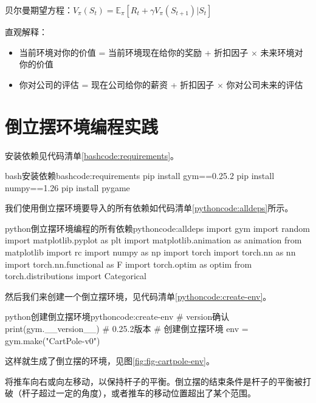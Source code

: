 \documentclass[lang=cn,newtx,10pt,scheme=chinese]{elegantbook}
\begin{document}
\begin{marker}
贝尔曼期望方程：$V_\pi(S_t) = \mathbb{E}_\pi[R_t+\gamma V_\pi(S_{t+1})|S_t]$
\end{marker}

\begin{marker}
直观解释：
\begin{itemize}
\item 当前环境对你的价值 = 当前环境现在给你的奖励 + 折扣因子 $\times$ 未来环境对你的价值
\item 你对公司的评估 = 现在公司给你的薪资 + 折扣因子 $\times$ 你对公司未来的评估
\end{itemize}
\end{marker}

\section{倒立摆环境编程实践}

安装依赖见代码清单\ref{bashcode:requirements}。

\begin{codebox}{bash}{安装依赖}{bashcode:requirements}
pip install gym==0.25.2
pip install numpy==1.26
pip install pygame
\end{codebox}

我们使用倒立摆环境要导入的所有依赖如代码清单\ref{pythoncode:alldeps}所示。

\begin{codebox}{python}{倒立摆环境编程的所有依赖}{pythoncode:alldeps}
import gym
import random
import matplotlib.pyplot as plt
import matplotlib.animation as animation
from matplotlib import rc
import numpy as np
import torch
import torch.nn as nn
import torch.nn.functional as F
import torch.optim as optim
from torch.distributions import Categorical
\end{codebox}

然后我们来创建一个倒立摆环境，见代码清单\ref{pythoncode:create-env}。

\begin{codebox}{python}{创建倒立摆环境}{pythoncode:create-env}
# version确认
print(gym.__version__)  # 0.25.2版本
# 创建倒立摆环境
env = gym.make("CartPole-v0")
\end{codebox}

这样就生成了倒立摆的环境，见图\ref{fig:fig-cartpole-env}。

将推车向右或向左移动，以保持杆子的平衡。倒立摆的结束条件是杆子的平衡被打破（杆子超过一定的角度），或者推车的移动位置超出了某个范围。
\end{document}
